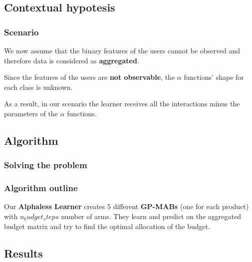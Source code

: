 
\subsection{Contextual hypotesis}


\begin{frame}

\frametitle{Scenario}

We now assume that the binary features of the users cannot be observed and therefore data is considered as \textbf{aggregated}.

Since the features of the users are \textbf{not observable}, the $\alpha$ functions' shape for each class is unknown.

As a result, in our scenario the learner receives all the interactions minus the parameters of the $\alpha$ functions.

\end{frame}


\subsection{Algorithm}


\begin{frame}

\frametitle{Solving the problem}


\end{frame}


\begin{frame}

\frametitle{Algorithm outline}

Our \textbf{Alphaless Learner} creates 5 different \textbf{GP-MABs} (one for each product) with $n_budget_steps$ number of arms.
They learn and predict on the aggregated budget matrix and try to find the optimal allocation of the budget.


\end{frame}


\subsection{Results}


\begin{frame}

\frametitle{}
\framesubtitle{}


\end{frame}

